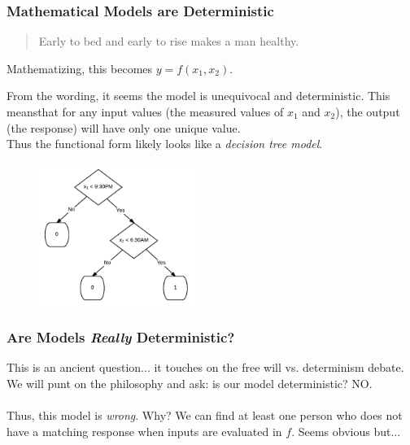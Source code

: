 \documentclass[slides]{beamer} %
\begin{document}
\begin{frame}\frametitle{Mathematical Models are Deterministic}

\small
\begin{quotation}
Early to bed and early to rise makes a man healthy.
\end{quotation}

Mathematizing, this becomes $y = f(x_1, x_2)$.\\

\begin{minipage}{0.4\textwidth}
\footnotesize
From the wording, it seems the model is unequivocal and deterministic. This meansthat for any input values (the measured values of $x_1$ and $x_2$), the output (the response) will have only one unique value.\\  \pause 
\vspace{0.2cm}
Thus the functional form likely looks like a \textit{decision tree model}.
\end{minipage}%
\begin{minipage}{0.6\textwidth}
\begin{figure}
\centering
\includegraphics[width=2in]{simple_health}
\end{figure}
\end{minipage}
	
\end{frame}

\begin{frame}\frametitle{Are Models \textit{Really} Deterministic?}

This is an ancient question... it touches on the free will vs. determinism debate.  \pause We will punt on the philosophy and ask: is our model deterministic? \pause NO. \\~\\

Thus, this model is \emph{wrong}. Why?  \pause We can find at least one person who does not have a matching response when inputs are evaluated in $f$. Seems obvious but...

\end{frame}
\end{document}
